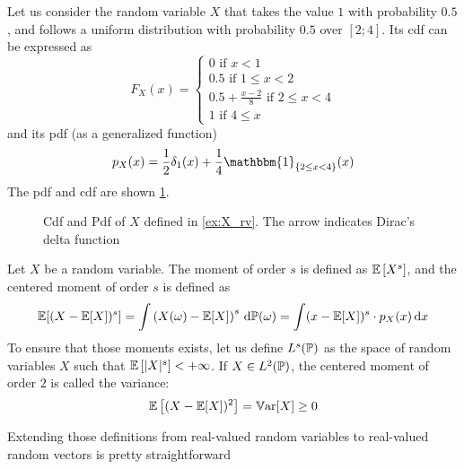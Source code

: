 \documentclass[../../Main_ManuscritThese.tex]{subfiles}
\newcommand\imgpath{/home/victor/acadwriting/Manuscrit/Text/Chapter2/img/}
\begin{document}
\begin{example}
  \label{ex:X_rv}
  Let us consider the random variable $X$ that takes the value $1$ with probability $0.5$, and follows a uniform distribution with probability $0.5$ over $[2;4]$. Its cdf can be expressed as
  \begin{equation}
    F_X(x) =
    \begin{cases}
      0 \text{ if } x < 1 \\
      0.5 \text{ if } 1 \leq x < 2 \\
      0.5 + \frac{x-2}{8} \text{ if } 2 \leq x < 4 \\
      1 \text{ if } 4 \leq x
    \end{cases}
  \end{equation}
  and its pdf (as a generalized function)
  \begin{equation}
    p_X(x) = \frac{1}{2}\delta_{1}(x) + \frac{1}{4}\mathbbm{1}_{\{2\leq x < 4\}}(x) 
  \end{equation}
  The pdf and cdf are shown \cref{fig:example_pdf_cdf}.
\end{example}
\begin{figure}[!h]
  \centering
  
  \caption{Cdf and Pdf of $X$ defined in \cref{ex:X_rv}. The arrow indicates Dirac's delta function}
  \label{fig:example_pdf_cdf}
\end{figure}

\begin{definition}
  Let $X$ be a random variable.
  The moment of order $s$ is defined as $\mathbb{E}\left[X^s\right]$, and the centered moment of order $s$ is defined as
  \begin{equation}
    \mathbb{E}[(X-\mathbb{E}[X])^s]=\int \left(X(\omega) - \mathbb{E}[X]\right)^s \,\mathrm{d}\mathbb{P}(\omega) = \int (x-\mathbb{E}[X])^s\cdot p_X(x)\,\mathrm{d}x
  \end{equation}
  To ensure that those moments exists, let us define $L^s(\mathbb{P})$ as the space of random variables $X$ such that $\mathbb{E}\left[\lvert X \rvert^s\right] < +\infty$.
  If $X\in L^2(\mathbb{P})$, the centered moment of order $2$ is called the variance:
  \begin{equation}
    \label{eq:variance_def}
    \mathbb{E}\left[(X-\mathbb{E}[X])^2 \right] = \mathbb{V}\mathrm{ar}[X] \geq 0
  \end{equation}
\end{definition}


Extending those definitions from real-valued random variables to real-valued random vectors is pretty straightforward
\end{document}
